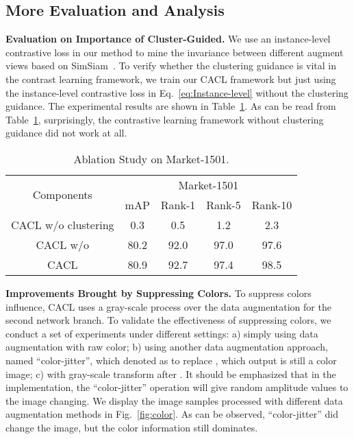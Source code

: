 \documentclass[journal]{IEEEtran}
\newcommand{\myparagraph}[1]{\noindent\textbf{#1.}}
\begin{document}
\subsection{More Evaluation and Analysis}





\myparagraph{Evaluation on Importance of Cluster-Guided}   We use an instance-level contrastive loss in our method to mine the invariance between different augment views based on  SimSiam~\cite{Chen:arxiv20}. To verify whether the clustering guidance is vital in the contrast learning framework, we train our CACL framework but just using the instance-level contrastive loss in Eq.~\eqref{eq:Instance-level} without the clustering guidance. 
The experimental results are shown in Table~\ref{Tab:Ablation Study_inSupportingMaterial}.
As can be read from Table~\ref{Tab:Ablation Study_inSupportingMaterial}, surprisingly, the contrastive learning framework without clustering guidance did not work at all. 


\begin{table}[!ht]
\small
\caption{Ablation Study on Market-1501.}
\begin{center}
{
\begin{tabular}{|c|c|c|c|c|}
					\hline		
					\multirow{2}{*}{Components} & \multicolumn{4}{c|}{Market-1501}\\
					\cline{2-5}  
					& mAP & Rank-1 &Rank-5&Rank-10\\
					
\hline\hline
{ CACL w/o clustering}  & 0.3 &0.5 &1.2 &2.3 \\
\hline
CACL w/o   & 80.2 &92.0 &97.0 &97.6\\
CACL  & {80.9}&{92.7}& {97.4 }&{98.5}\\

\hline
\end{tabular}
}
\end{center}

\label{Tab:Ablation Study_inSupportingMaterial}
\end{table}









\myparagraph{Improvements Brought by Suppressing Colors} 
To suppress colors influence,  CACL uses a gray-scale process  over the data augmentation  for the second network branch.  To validate the effectiveness of suppressing colors,  we conduct a set of experiments under different settings: a) simply using data augmentation  with raw color; b) using another data augmentation approach, named ``color-jitter'', which denoted as  to replace , which output is still a color image; 
c) with gray-scale transform  after .  It should be emphasized that in the implementation, the ``color-jitter'' operation will give random amplitude values to the image changing.
We display the image samples processed with different data augmentation methods in Fig.~\ref{fig:color}. As can be observed, ``color-jitter'' did change the image, but the color information still dominates. 
\end{document}
